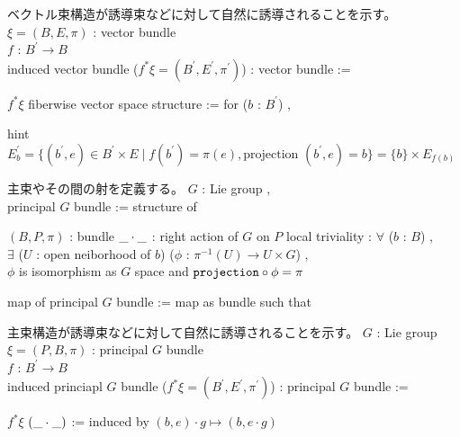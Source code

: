 \begin{Definition}
\itemnote
  ベクトル束構造が誘導束などに対して自然に誘導されることを示す。
\itemdefi
  \For \(\xi = (B , E , \pi)\) : vector bundle \\
  \For \(f\) : \(B^{\prime} \to B\) \\
  \Define induced vector bundle (\(f^*\xi = (B^{\prime} , E^{\prime} , \pi^{\prime})\)) : vector bundle :=
  \begin{itemize}
    \itembase \(f^*\xi\)
    \itemenum fiberwise vector space structure :=
      for (\(b\) : \(B^{\prime}\)) , 
  \end{itemize}
  hint \(E^{\prime}_b = \{(b^{\prime} , e) \in B^{\prime} \times E \mid f(b^{\prime}) = \pi(e) , \text{projection }(b^{\prime} , e) = b\} = \{b\} \times E_{f(b)}\)
\end{Definition}

\begin{Definition}
\itemnote
  主束やその間の射を定義する。
\itemdefi
  \For \(G\) : Lie group ,\\
  \Define principal \(G\) bundle := structure of
  \begin{itemize}
    \itembase \((B , P , \pi)\) : bundle
    \itemenum \(\_ \cdot \_\) : right action of \(G\) on \(P\)
    \itemwith local triviality :
      \(\forall\) (\(b\) : \(B\)) ,\\
      \(\exists\) (\(U\) : open neiborhood of \(b\)) (\(\phi\) : \(\pi^{-1}(U) \to U \times G\)) , \\
      \(\phi\) is isomorphism as \(G\) space and \(\texttt{projection} \circ \phi = \pi\)
  \end{itemize}
\itemdefi
  \Define map of principal \(G\) bundle := map as bundle such that 
\end{Definition}

\begin{Definition}
\itemnote
  主束構造が誘導束などに対して自然に誘導されることを示す。
\itemdefi
  \For \(G\) : Lie group \\
  \For \(\xi = (P , B , \pi)\) : principal \(G\) bundle \\
  \For \(f\) : \(B^{\prime} \to B\) \\
  \Define induced princiapl \(G\) bundle (\(f^*\xi = (B^{\prime} , E^{\prime} , \pi^{\prime})\)) : principal \(G\) bundle :=
  \begin{itemize}
    \itembase \(f^*\xi\)
    \itemenum \((\_ \cdot \_)\) := induced by \((b , e) \cdot g \mapsto (b , e \cdot g)\)
  \end{itemize}
\end{Definition}

